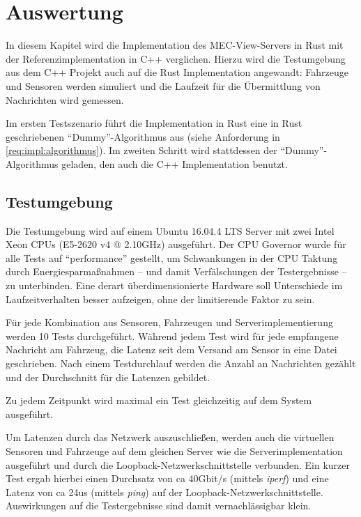 
			
\chapter{Auswertung}

In diesem Kapitel wird die Implementation des MEC-View-Servers in Rust mit der Referenzimplementation in C++ verglichen.
Hierzu wird die Testumgebung aus dem C++ Projekt auch auf die Rust Implementation angewandt: Fahrzeuge und Sensoren werden simuliert und die Laufzeit für die Übermittlung von Nachrichten wird gemessen.

Im ersten Testszenario führt die Implementation in Rust eine in Rust geschriebenen \enquote{Dummy}-Algorithmus aus (siehe Anforderung  in \autoref{req:impl:algorithmus}).
Im zweiten Schritt wird stattdessen der \enquote{Dummy}-Algorithmus geladen, den auch die C++ Implementation benutzt.



\section{Testumgebung}

Die Testumgebung wird auf einem Ubuntu 16.04.4 LTS Server mit zwei Intel Xeon CPUs (E5-2620 v4 @ 2.10GHz) ausgeführt.
Der CPU Governor wurde für alle Tests auf \enquote{performance} gestellt, um Schwankungen in der CPU Taktung durch Energiesparmaßnahmen -- und damit Verfälschungen der Testergebnisse -- zu unterbinden.
Eine derart überdimensionierte Hardware soll Unterschiede im Laufzeitverhalten besser aufzeigen, ohne der limitierende Faktor zu sein.

Für jede Kombination aus Sensoren, Fahrzeugen und Serverimplementierung werden 10 Tests durchgeführt.
Während jedem Test wird für jede empfangene Nachricht am Fahrzeug, die Latenz seit dem Versand am Sensor in eine Datei geschrieben.
Nach einem Testdurchlauf werden die Anzahl an Nachrichten gezählt und der Durchschnitt für die Latenzen gebildet.

Zu jedem Zeitpunkt wird maximal ein Test gleichzeitig auf dem System ausgeführt.

Um Latenzen durch das Netzwerk auszuschließen, werden auch die virtuellen Sensoren und Fahrzeuge auf dem gleichen Server wie die Serverimplementation ausgeführt und durch die Loopback-Netzwerkschnittstelle verbunden.
Ein kurzer Test ergab hierbei einen Durchsatz von ca 40Gbit/s (mittels \textit{iperf}) und eine Latenz von ca 24us (mittels \textit{ping}) auf der Loopback-Netzwerkschnittstelle.
Auswirkungen auf die Testergebnisse sind damit vernachlässigbar klein.

